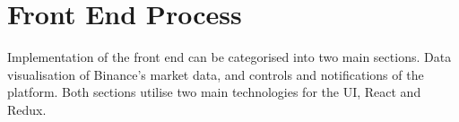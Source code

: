\section{Front End Process}
\label{sec:implementation:frontend}

\noindent Implementation of the front end can be categorised into two main sections. Data visualisation of Binance's market data, and controls and notifications of the platform. Both sections utilise two main technologies for the UI, React and Redux.